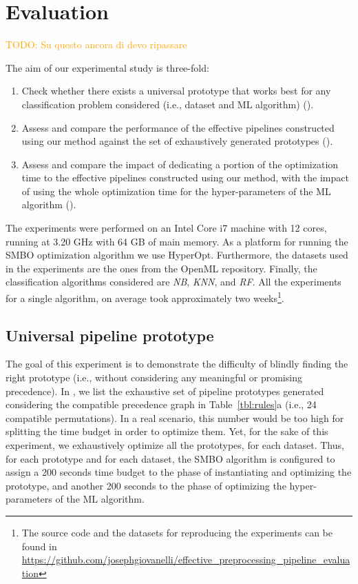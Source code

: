 \section{Evaluation}
\label{sec:evaluation}

\textcolor{orange}{TODO: Su questo ancora di devo ripassare}

The aim of our experimental study is three-fold:
\begin{enumerate}
    \item Check whether there exists a universal prototype that works best for any classification problem considered  (i.e., dataset and ML algorithm) ().
    \item Assess and compare the performance of the effective pipelines constructed using our method against the set of exhaustively generated prototypes ().
    \item Assess and compare the impact of dedicating a portion of the optimization time to the effective pipelines constructed using our method, with the impact of using the whole optimization time for the hyper-parameters of the ML algorithm ().
\end{enumerate}

The experiments were performed on an Intel Core i7 machine with 12 cores, running at 3.20 GHz with 64 GB of main memory. As a platform for running the SMBO optimization algorithm we use HyperOpt. Furthermore, the datasets used in the experiments are the ones from the OpenML repository. Finally, the classification algorithms considered are \textit{NB}, \textit{KNN}, and \textit{RF}. All the experiments for a single algorithm, on average took approximately two weeks\footnote{The source code and the datasets for reproducing the experiments can be found in
\href{https://github.com/josephgiovanelli/effective\_preprocessing\_pipeline\_evaluation}{https://github.com/josephgiovanelli/effective\_preprocessing\_pipeline\_evaluation}}.

\subsection{Universal pipeline prototype}
\label{sec:eval-universal-pipeline}
The goal of this experiment is to demonstrate the difficulty of blindly finding the right prototype (i.e., without considering any meaningful or promising precedence).
In , we list the exhaustive set of pipeline prototypes generated considering the compatible precedence graph in Table~\ref{tbl:rules}a (i.e., 24 compatible permutations).
In a real scenario, this number would be too high for splitting the time budget in order to optimize them.
Yet, for the sake of this experiment, we exhaustively optimize all the prototypes, for each dataset.
Thus, for each prototype and for each dataset, the SMBO algorithm is configured to assign a 200 seconds time budget to the phase of instantiating and optimizing the prototype, and another 200 seconds to the phase of optimizing the hyper-parameters of the ML algorithm.

